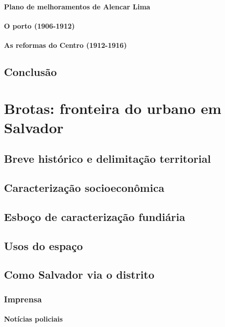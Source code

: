 \documentclass[
	12pt,					%
	openright,			%
	twoside,			%
	a4paper,			%
	english,				%
	french,				%
	spanish,			%
	brazil				%
	]{abntex2}
\begin{document}
\subsubsection{Plano de melhoramentos de Alencar Lima}
\lipsum[50]
\subsubsection{O porto (1906-1912)}
\lipsum[50]
\subsubsection{As reformas do Centro (1912-1916)}
\lipsum[50]
\section{Conclusão}\label{sec:1.4}
\lipsum[50]
\chapter{Brotas: fronteira do urbano em Salvador}\label{cap:2}
\lipsum[50]
\section{Breve histórico e delimitação territorial}\label{sec:2.1}
\lipsum[50]
\section{Caracterização socioeconômica}\label{sec:2.2}
\lipsum[50]
\section{Esboço de caracterização fundiária}\label{sec:2.3}
\lipsum[50]
\section{Usos do espaço}\label{sec:2.4}
\lipsum[50]
\section{Como Salvador via o distrito}\label{sec:2.5}
\lipsum[50]
\subsection{Imprensa}\label{subsec:2.5.1}
\lipsum[50]
\subsubsection{Notícias policiais}\label{subsubsec:2.5.1.1}
\lipsum[50]
\end{document}
